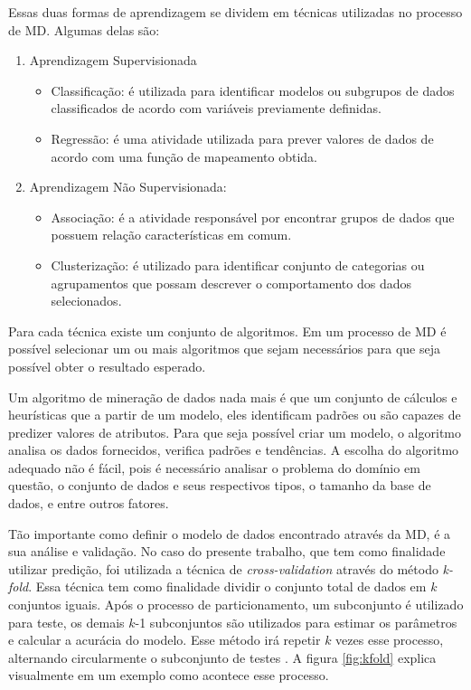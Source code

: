 Essas duas formas de aprendizagem se dividem em técnicas utilizadas no processo de MD. Algumas delas são:
\begin{enumerate}
\item Aprendizagem Supervisionada
\begin{itemize}
\item Classificação: é utilizada para identificar modelos ou subgrupos de dados classificados de acordo com variáveis previamente definidas.
\item Regressão: é uma atividade utilizada para prever valores de dados de acordo com uma função de mapeamento obtida.
\end{itemize}
\item Aprendizagem Não Supervisionada: 
\begin{itemize}
\item Associação: é a atividade responsável por encontrar grupos de dados que possuem relação características em comum.
\item Clusterização: é utilizado para identificar conjunto de categorias ou agrupamentos que possam descrever o comportamento dos dados selecionados.
\end{itemize}
\end{enumerate}

Para cada técnica existe um conjunto de algoritmos. Em um processo de MD é possível selecionar um ou mais algoritmos que sejam necessários para que seja possível obter o resultado esperado.

Um algoritmo de mineração de dados nada mais é que um conjunto de cálculos e heurísticas que a partir de um modelo, eles identificam padrões ou são capazes de predizer valores de atributos. Para que seja possível criar um modelo, o algoritmo analisa os dados fornecidos, verifica padrões e tendências. A escolha do algoritmo adequado não é fácil, pois é necessário analisar o problema do domínio em questão, o conjunto de dados e seus respectivos tipos, o tamanho da base de dados, e entre outros fatores.

Tão importante como definir o modelo de dados encontrado através da MD, é a sua análise e validação. No caso do presente trabalho, que tem como finalidade utilizar predição, foi utilizada a técnica de \textit{cross-validation} através do método \textit{k-fold}. Essa técnica tem como finalidade dividir o conjunto total de dados em $k$ conjuntos iguais. Após o processo de particionamento, um subconjunto é utilizado para teste, os demais $k$-1 subconjuntos são utilizados para estimar os parâmetros e calcular a acurácia do modelo. Esse método irá repetir $k$ vezes esse processo, alternando circularmente o subconjunto de testes \cite{han2011data}. A figura \ref{fig:kfold} explica visualmente em um exemplo como acontece esse processo.

